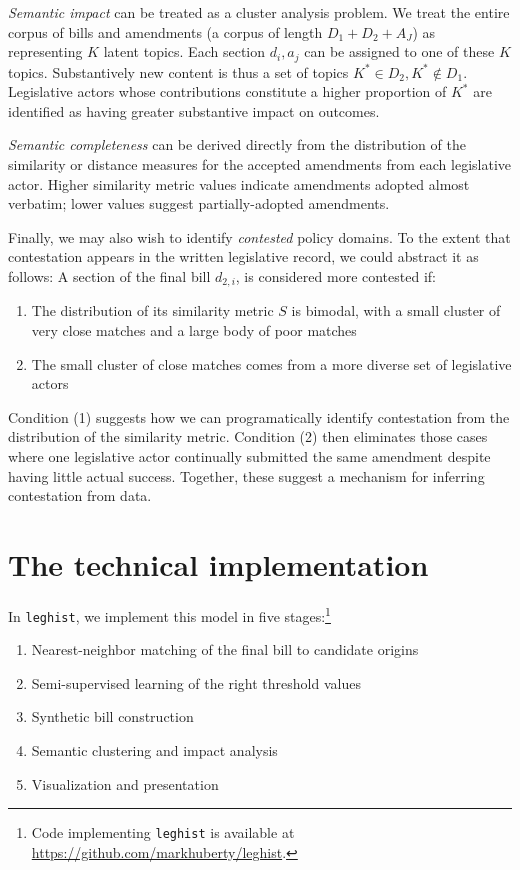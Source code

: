 \documentclass[11pt]{article}
\begin{document}
\textit{Semantic impact} can be treated as a cluster analysis
problem. We treat the entire corpus of bills and amendments (a corpus
of length $D_1 + D_2 + A_J$) as representing $K$ latent topics. Each
section $d_i, a_j$ can be assigned to one of these $K$
topics. Substantively new content is thus a set of topics $K^* \in
D_2, K^* \not \in D_1$. Legislative actors whose contributions
constitute a higher proportion of $K^*$ are identified as having
greater substantive impact on outcomes. 

\textit{Semantic completeness} can be derived directly from the
distribution of the similarity or distance measures for the accepted
amendments from each legislative actor. Higher similarity
metric values indicate amendments adopted almost verbatim; lower
values suggest partially-adopted amendments. 

Finally, we may also wish to identify \textit{contested} policy
domains. To the extent that contestation appears in the written
legislative record, we could abstract it as follows: A section
of the final bill $d_{2,i}$, is considered more contested if:

\begin{enumerate}
\item The distribution of its similarity metric $S$ is bimodal, with a
  small cluster of very close matches and a large body of poor matches
\item The small cluster of close matches comes from a more diverse set
  of legislative actors
\end{enumerate}

Condition (1) suggests how we can programatically identify
contestation from the distribution of the similarity metric. Condition
(2) then eliminates those cases where one legislative actor
continually submitted the same amendment despite having little actual
success. Together, these suggest a mechanism for inferring
contestation from data.

\section{The technical implementation}
\label{sec:legisl-sect-match}

In \texttt{leghist}, we implement this model in five stages:\footnote{
Code implementing \texttt{leghist} is available at \url{https://github.com/markhuberty/leghist}.}
\begin{enumerate}
\item Nearest-neighbor matching of the final bill to candidate origins
\item Semi-supervised learning of the right threshold values
\item Synthetic bill construction
\item Semantic clustering and impact analysis
\item Visualization and presentation
\end{enumerate}
\end{document}
